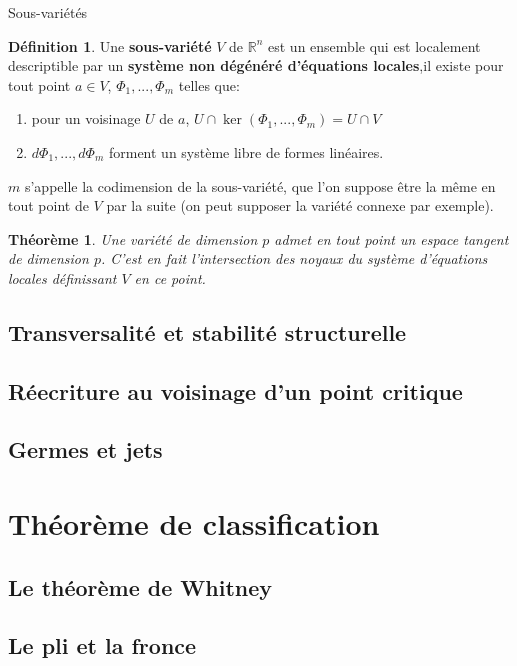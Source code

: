 \documentclass{beamer}
\newcommand{\R}{\mathbb{R}}
\newtheorem{thm}{Théorème}
\theoremstyle{definition}
\newtheorem{defn}{Définition}
\begin{document}
\begin{frame}{Sous-variétés}
    \begin{defn}
        Une \textbf{sous-variété} $V$ de $\R^n$ est un ensemble qui est localement descriptible par un \textbf{système non dégénéré d'équations locales},il existe pour tout point $a\in V$, $\Phi_1,...,\Phi_m$ telles que:
        \begin{enumerate}[<+->]
            \item pour un voisinage $U$ de $a$, $U\cap\ker(\Phi_1,...,\Phi_m)=U\cap V$
            \item $d\Phi_1,...,d\Phi_m$ forment un système libre de formes linéaires.
        \end{enumerate}

        $m$ s'appelle la codimension de la sous-variété, que l'on suppose être la même en tout point de $V$ par la suite (on peut supposer la variété connexe par exemple).
    \end{defn}
    \pause
    \begin{thm}
        Une variété de dimension $p$ admet en tout point un espace tangent de dimension $p$.
        C'est en fait l'intersection des noyaux du système d'équations locales définissant $V$ en ce point.
    \end{thm}
\end{frame}

\subsection{Transversalité et stabilité structurelle}
\subsection{Réecriture au voisinage d'un point critique}
\subsection{Germes et jets}

\section{Théorème de classification}
\subsection{Le théorème de Whitney}
\subsection{Le pli et la fronce}
\end{document}
